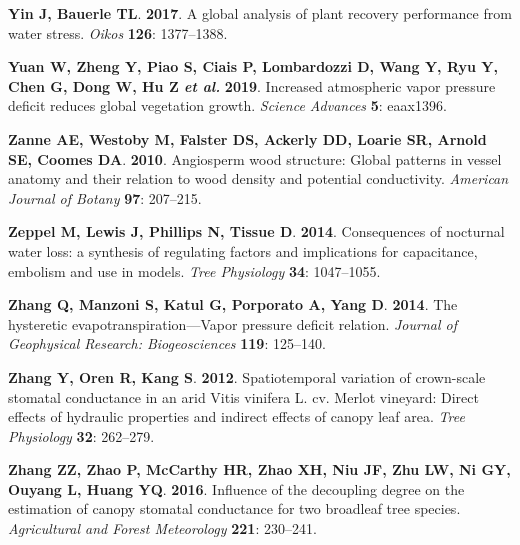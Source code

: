 \documentclass[11pt,twoside]{reedthesis}
\begin{document}
\hypertarget{ref-Yin2017}{}
\textbf{\textnormal{Yin J}, \textnormal{Bauerle TL}}. \textbf{2017}. A
global analysis of plant recovery performance from water stress.
\emph{Oikos} \textbf{126}: 1377--1388.

\hypertarget{ref-yuan_increased_2019}{}
\textbf{\textnormal{Yuan W}, \textnormal{Zheng Y}, \textnormal{Piao S},
\textnormal{Ciais P}, \textnormal{Lombardozzi D}, \textnormal{Wang Y},
\textnormal{Ryu Y}, \textnormal{Chen G}, \textnormal{Dong W},
\textnormal{Hu Z} \emph{et al.}} \textbf{2019}. Increased atmospheric
vapor pressure deficit reduces global vegetation growth. \emph{Science
Advances} \textbf{5}: eaax1396.

\hypertarget{ref-Zanne2010}{}
\textbf{\textnormal{Zanne AE}, \textnormal{Westoby M},
\textnormal{Falster DS}, \textnormal{Ackerly DD}, \textnormal{Loarie
SR}, \textnormal{Arnold SE}, \textnormal{Coomes DA}}. \textbf{2010}.
Angiosperm wood structure: Global patterns in vessel anatomy and their
relation to wood density and potential conductivity. \emph{American
Journal of Botany} \textbf{97}: 207--215.

\hypertarget{ref-Zeppel2014}{}
\textbf{\textnormal{Zeppel M}, \textnormal{Lewis J},
\textnormal{Phillips N}, \textnormal{Tissue D}}. \textbf{2014}.
Consequences of nocturnal water loss: a synthesis of regulating factors
and implications for capacitance, embolism and use in models. \emph{Tree
Physiology} \textbf{34}: 1047--1055.

\hypertarget{ref-Zhang2014}{}
\textbf{\textnormal{Zhang Q}, \textnormal{Manzoni S}, \textnormal{Katul
G}, \textnormal{Porporato A}, \textnormal{Yang D}}. \textbf{2014}. The
hysteretic evapotranspiration---Vapor pressure deficit relation.
\emph{Journal of Geophysical Research: Biogeosciences} \textbf{119}:
125--140.

\hypertarget{ref-zhang_spatiotemporal_2012}{}
\textbf{\textnormal{Zhang Y}, \textnormal{Oren R}, \textnormal{Kang S}}.
\textbf{2012}. Spatiotemporal variation of crown-scale stomatal
conductance in an arid Vitis vinifera L. cv. Merlot vineyard: Direct
effects of hydraulic properties and indirect effects of canopy leaf
area. \emph{Tree Physiology} \textbf{32}: 262--279.

\hypertarget{ref-zhang_influence_2016}{}
\textbf{\textnormal{Zhang ZZ}, \textnormal{Zhao P}, \textnormal{McCarthy
HR}, \textnormal{Zhao XH}, \textnormal{Niu JF}, \textnormal{Zhu LW},
\textnormal{Ni GY}, \textnormal{Ouyang L}, \textnormal{Huang YQ}}.
\textbf{2016}. Influence of the decoupling degree on the estimation of
canopy stomatal conductance for two broadleaf tree species.
\emph{Agricultural and Forest Meteorology} \textbf{221}: 230--241.
\end{document}

